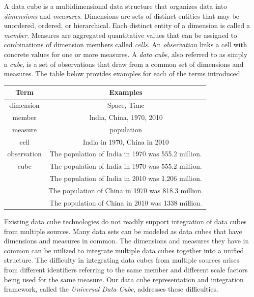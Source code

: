 A data cube is a multidimensional data structure that organizes data into \emph{dimensions} and \emph{measures}. Dimensions are sets of distinct entities that may be unordered, ordered, or hierarchical. Each distinct entity of a dimension is called a \emph{member}. Measures are aggregated quantitative values that can be assigned to combinations of dimension members called \emph{cells}. An \emph{observation} links a cell with concrete values for one or more measures. A \emph{data cube}, also referred to as simply a \emph{cube}, is a set of observations that draw from a common set of dimensions and measures. The table below provides examples for each of the terms introduced.

\begin{center}
  \begin{tabular}{ | c | c | }
    \hline
    \textbf{Term} & \textbf{Examples} \\ \hline
    dimension & Space, Time \\ \hline
    member & India, China, 1970, 2010 \\ \hline
    measure & population \\ \hline
    cell & India in 1970, China in 2010 \\ \hline
    observation & The population of India in 1970 was 555.2 million. \\ \hline
    cube & The population of India in 1970 was 555.2 million. \\
         & The population of India in 2010 was 1,206 million. \\
         & The population of China in 1970 was 818.3 million. \\
         & The population of China in 2010 was 1338 million. \\ \hline
  \end{tabular}
\end{center}

Existing data cube technologies do not readily support integration of data cubes from multiple sources. Many data sets can be modeled as data cubes that have dimensions and measures in common. The dimensions and measures they have in common can be utilized to integrate multiple data cubes together into a unified structure. The difficulty in integrating data cubes from multiple sources arises from different identifiers referring to the same member and different scale factors being used for the same measure. Our data cube representation and integration framework, called the \emph{Universal Data Cube}, addresses these difficulties.

